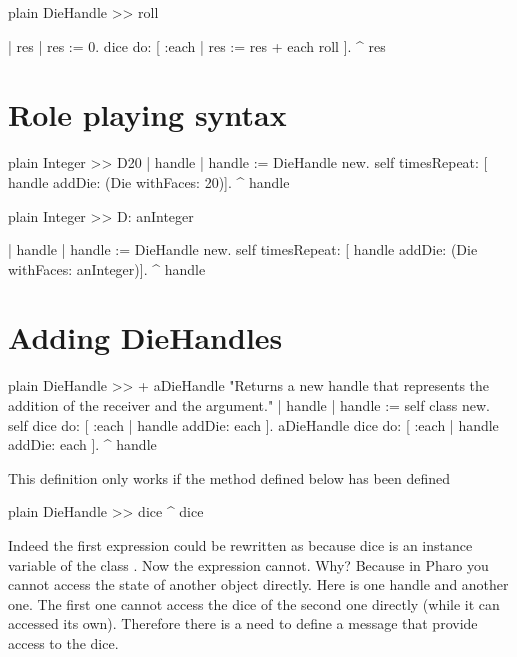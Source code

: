 \documentclass[10pt,twoside,english]{_support/latex/sbabook/sbabook}
\begin{document}
\begin{displaycode}{plain}
DieHandle >> roll
	
	| res |
	res := 0.
	dice do: [ :each | res := res + each roll ].
	^ res
\end{displaycode}
\section{Role playing syntax}
\begin{displaycode}{plain}
Integer >> D20
	| handle |
	handle := DieHandle new.
	self timesRepeat: [ handle addDie: (Die withFaces: 20)].
	^ handle
\end{displaycode}

\begin{displaycode}{plain}
Integer >> D: anInteger
	
	| handle |
	handle := DieHandle new.
	self timesRepeat: [ handle addDie: (Die withFaces: anInteger)].
	^ handle
\end{displaycode}
\section{Adding DieHandles}
\begin{displaycode}{plain}
DieHandle >> + aDieHandle
	"Returns a new handle that represents the addition of the receiver and the argument."
	| handle |
	handle := self class new.
	self dice do: [ :each | handle addDie: each ].
	aDieHandle dice do: [ :each | handle addDie: each ].
	^ handle
\end{displaycode}

This definition only works if the method  defined below has been defined

\begin{displaycode}{plain}
DieHandle >> dice
	^ dice 
\end{displaycode}

Indeed the first expression  could be rewritten as  because dice is an instance variable of the class . Now the expression  cannot. Why? Because in Pharo you cannot access the state of another object directly. Here   is one handle and  another one. The first one cannot access the dice of the second one directly (while it can accessed its own). Therefore there is a need to define a message that provide access to the dice. 


\backmatter



\end{document}
